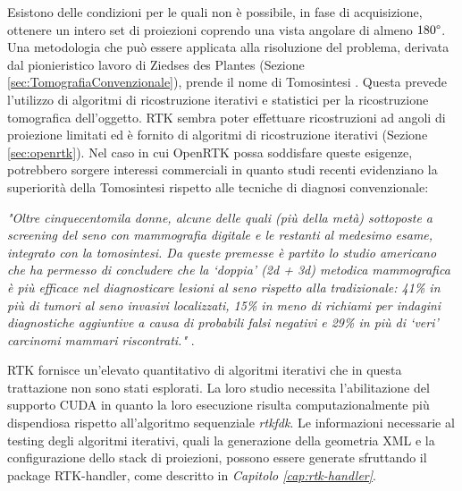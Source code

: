 \documentclass[a4paper,12pt, doubleside]{report}
\begin{document}
            \bigskip
            \par
                Esistono delle condizioni per le quali non è possibile, in fase di acquisizione, ottenere un intero set di proiezioni coprendo una vista angolare di almeno $180\degree$. Una metodologia che può essere applicata alla risoluzione del problema, derivata dal pionieristico lavoro di Ziedses des Plantes \cite{ziedses-tomo} (Sezione \ref{sec:TomografiaConvenzionale}), prende il nome di Tomosintesi \cite{tomosintesi}. Questa prevede l'utilizzo di algoritmi di ricostruzione iterativi e statistici per la ricostruzione tomografica dell'oggetto. RTK sembra poter effettuare ricostruzioni ad angoli di proiezione limitati \cite{rtk-users-tomosinthesys} ed è fornito di algoritmi di ricostruzione iterativi (Sezione \ref{sec:openrtk}). Nel caso in cui OpenRTK possa soddisfare queste esigenze, potrebbero sorgere interessi commerciali in quanto studi recenti \cite{studio-mammografia} evidenziano la superiorità della Tomosintesi rispetto alle tecniche di diagnosi convenzionale:
    
            \bigskip
            \par
                \textit{"Oltre cinquecentomila donne, alcune delle quali (più della metà) sottoposte a screening del seno con mammografia digitale e le restanti al medesimo esame, integrato con la tomosintesi. Da queste premesse è partito lo studio americano che ha permesso di concludere che la ‘doppia’ (2d + 3d) metodica mammografica è più efficace nel diagnosticare lesioni al seno rispetto alla tradizionale: 41\% in più di tumori al seno invasivi localizzati, 15\% in meno di richiami per indagini diagnostiche aggiuntive a causa di probabili falsi negativi e 29\% in più di ‘veri’ carcinomi mammari riscontrati."} \cite{fondazioneveronesi}.
                
            \bigskip
            \par
                RTK fornisce un'elevato quantitativo di algoritmi iterativi che in questa trattazione non sono stati esplorati. La loro studio necessita l'abilitazione del supporto CUDA in quanto la loro esecuzione risulta computazionalmente più dispendiosa rispetto all'algoritmo sequenziale \textit{rtkfdk}. Le informazioni necessarie al testing degli algoritmi iterativi, quali la generazione della geometria XML e la configurazione dello stack di proiezioni, possono essere generate sfruttando il package RTK-handler, come descritto in \textit{Capitolo \ref{cap:rtk-handler}}.
                    
\end{document}
